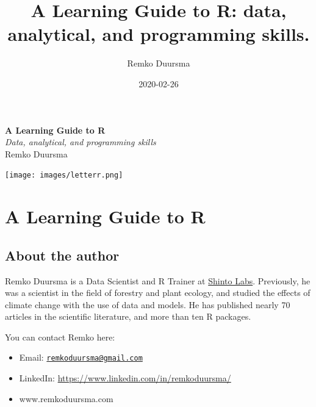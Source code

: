 \documentclass[]{book}
\title{A Learning Guide to R: data, analytical, and programming skills.}
\author{Remko Duursma}
\date{2020-02-26}
\providecommand{\tightlist}{%
  \setlength{\itemsep}{0pt}\setlength{\parskip}{0pt}}
\let\oldmaketitle\maketitle
\begin{document}
\maketitle

\thispagestyle{empty}
\begin{center}

{ \Huge \textbf{A Learning Guide to R}}\\[0.4cm]
{ \large \textit{Data, analytical, and programming skills}} \\



\bigskip
\large{Remko Duursma}\\
\vfill

\texttt{[image: images/letterr.png]}\\[1cm]

\end{center}


\let\maketitle\oldmaketitle
\maketitle

{
\setcounter{tocdepth}{1}
\tableofcontents
}
\hypertarget{a-learning-guide-to-r}{%
\chapter{A Learning Guide to R}\label{a-learning-guide-to-r}}

\hypertarget{about-the-author}{%
\section{About the author}\label{about-the-author}}

Remko Duursma is a Data Scientist and R Trainer at \href{http://www.shintolabs.nl}{Shinto Labs}. Previously, he was a scientist in the field of forestry and plant ecology, and studied the effects of climate change with the use of data and models. He has published nearly 70 articles in the scientific literature, and more than ten R packages.

You can contact Remko here:

\begin{itemize}
\tightlist
\item
  Email: \href{mailto:remkoduursma@gmail.com}{\nolinkurl{remkoduursma@gmail.com}}
\item
  LinkedIn: \url{https://www.linkedin.com/in/remkoduursma/}
\item
  www.remkoduursma.com
\end{itemize}
\end{document}
